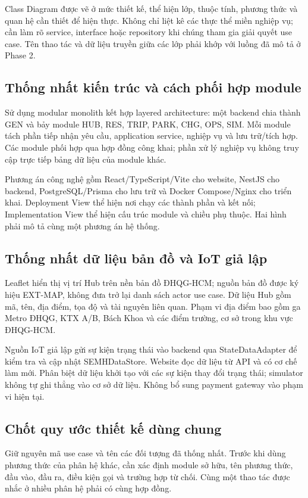 \documentclass[10pt,a4paper]{article}
\begin{document}
Class Diagram được vẽ ở mức thiết kế, thể hiện lớp, thuộc tính, phương thức và quan hệ cần thiết để hiện thực. Không chỉ liệt kê các thực thể miền nghiệp vụ; cần làm rõ service, interface hoặc repository khi chúng tham gia giải quyết use case. Tên thao tác và dữ liệu truyền giữa các lớp phải khớp với luồng đã mô tả ở Phase 2.

\subsection{Thống nhất kiến trúc và cách phối hợp module}
Sử dụng modular monolith kết hợp layered architecture: một backend chia thành GEN và bảy module HUB, RES, TRIP, PARK, CHG, OPS, SIM. Mỗi module tách phần tiếp nhận yêu cầu, application service, nghiệp vụ và lưu trữ/tích hợp. Các module phối hợp qua hợp đồng công khai; phần xử lý nghiệp vụ không truy cập trực tiếp bảng dữ liệu của module khác.

Phương án công nghệ gồm React/TypeScript/Vite cho website, NestJS cho backend, PostgreSQL/Prisma cho lưu trữ và Docker Compose/Nginx cho triển khai. Deployment View thể hiện nơi chạy các thành phần và kết nối; Implementation View thể hiện cấu trúc module và chiều phụ thuộc. Hai hình phải mô tả cùng một phương án hệ thống.

\subsection{Thống nhất dữ liệu bản đồ và IoT giả lập}
Leaflet hiển thị vị trí Hub trên nền bản đồ ĐHQG-HCM; nguồn bản đồ được ký hiệu EXT-MAP, không đưa trở lại danh sách actor use case. Dữ liệu Hub gồm mã, tên, địa điểm, tọa độ và tài nguyên liên quan. Phạm vi địa điểm bao gồm ga Metro ĐHQG, KTX A/B, Bách Khoa và các điểm trường, cơ sở trong khu vực ĐHQG-HCM.

Nguồn IoT giả lập gửi sự kiện trạng thái vào backend qua StateDataAdapter để kiểm tra và cập nhật SEMHDataStore. Website đọc dữ liệu từ API và có cơ chế làm mới. Phân biệt dữ liệu khởi tạo với các sự kiện thay đổi trạng thái; simulator không tự ghi thẳng vào cơ sở dữ liệu. Không bổ sung payment gateway vào phạm vi hiện tại.

\subsection{Chốt quy ước thiết kế dùng chung}
Giữ nguyên mã use case và tên các đối tượng đã thống nhất. Trước khi dùng phương thức của phân hệ khác, cần xác định module sở hữu, tên phương thức, đầu vào, đầu ra, điều kiện gọi và trường hợp từ chối. Cùng một thao tác được nhắc ở nhiều phân hệ phải có cùng hợp đồng.
\end{document}
